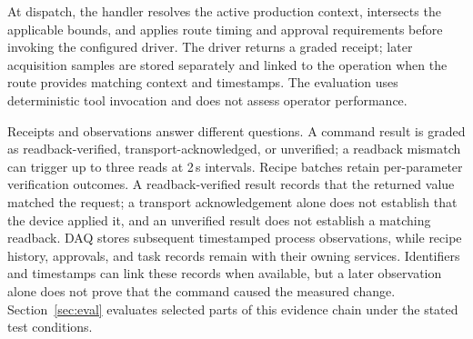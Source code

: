 At dispatch, the handler resolves the active production context, intersects
the applicable bounds, and applies route timing and approval requirements
before invoking the configured driver. The driver returns a graded receipt;
later acquisition samples are stored separately and linked to the operation
when the route provides matching context and timestamps. The evaluation uses
deterministic tool invocation and does not assess operator performance.

Receipts and observations answer different questions. A command result is
graded as readback-verified, transport-acknowledged, or unverified; a
readback mismatch can trigger up to three reads at 2\,s intervals. Recipe
batches retain per-parameter verification outcomes. A readback-verified result
records that the returned value matched the request; a transport acknowledgement
alone does not establish that the device applied it, and an unverified result
does not establish a matching readback. DAQ stores subsequent timestamped
process observations, while recipe history, approvals, and task records remain
with their owning services. Identifiers and timestamps can link these records
when available, but a later observation alone does not prove that the command
caused the measured change. Section~\ref{sec:eval} evaluates selected parts of
this evidence chain under the stated test conditions.

